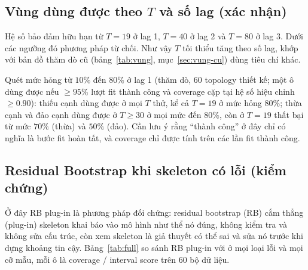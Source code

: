 \subsection{Vùng dùng được theo $T$ và số lag (xác nhận)}\label{sec:vung}
Hệ số bảo đảm hữu hạn từ $T=19$ ở lag 1, $T=40$ ở lag 2 và $T=80$ ở lag 3. Dưới các ngưỡng đó phương pháp từ chối. Như vậy $T$ tối thiểu tăng theo số lag, khớp với bản đồ thăm dò cũ (bảng~\ref{tab:vung}, mục~\ref{sec:vung-cu}) dùng tiêu chí khác.

Quét mức hỏng từ $10\%$ đến $80\%$ ở lag 1 (thăm dò, $60$ topology thiết kế; một ô dùng được nếu $\ge95\%$ lượt fit thành công và coverage cặp tại hệ số hiệu chỉnh $\ge0.90$): thiếu cạnh dùng được ở mọi $T$ thử, kể cả $T=19$ ở mức hỏng $80\%$; thừa cạnh và đảo cạnh dùng được ở $T\ge30$ ở mọi mức đến $80\%$, còn ở $T=19$ thất bại từ mức $70\%$ (thừa) và $50\%$ (đảo). Cần lưu ý rằng ``thành công'' ở đây chỉ có nghĩa là bước fit hoàn tất, và coverage chỉ được tính trên các lần fit thành công.

\subsection{Residual Bootstrap khi skeleton có lỗi (kiểm chứng)}\label{sec:rb}
Ở đây RB plug-in là phương pháp đối chứng: residual bootstrap (RB) cắm thẳng (plug-in) skeleton khai báo vào mô hình như thể nó đúng, không kiểm tra và không sửa cấu trúc, còn \ours{} xem skeleton là giả thuyết có thể sai và sửa nó trước khi dựng khoảng tin cậy. Bảng~\ref{tab:full} so sánh RB plug-in với \ours{} ở mọi loại lỗi và mọi cỡ mẫu, mỗi ô là coverage / interval score trên 60 bộ dữ liệu.

